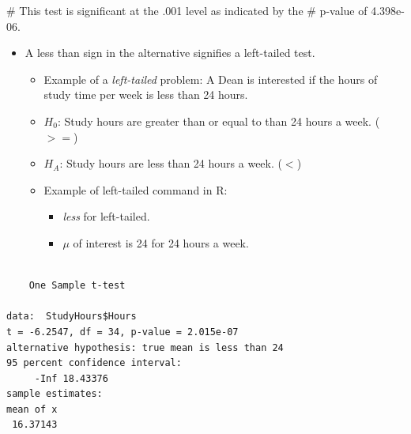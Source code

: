 \documentclass[
  letterpaper,
  DIV=11,
  numbers=noendperiod]{scrreprt}
\newenvironment{Shaded}{\begin{snugshade}}{\end{snugshade}}
\newcommand{\AttributeTok}[1]{\textcolor[rgb]{0.40,0.45,0.13}{#1}}
\newcommand{\CommentTok}[1]{\textcolor[rgb]{0.37,0.37,0.37}{#1}}
\newcommand{\DecValTok}[1]{\textcolor[rgb]{0.68,0.00,0.00}{#1}}
\newcommand{\FunctionTok}[1]{\textcolor[rgb]{0.28,0.35,0.67}{#1}}
\newcommand{\NormalTok}[1]{\textcolor[rgb]{0.00,0.23,0.31}{#1}}
\newcommand{\SpecialCharTok}[1]{\textcolor[rgb]{0.37,0.37,0.37}{#1}}
\newcommand{\StringTok}[1]{\textcolor[rgb]{0.13,0.47,0.30}{#1}}
\providecommand{\tightlist}{%
  \setlength{\itemsep}{0pt}\setlength{\parskip}{0pt}}\usepackage{longtable,booktabs,array}
\begin{document}
\begin{Shaded}
\begin{Highlighting}[]
\CommentTok{\# This test is significant at the .001 level as indicated by the}
\CommentTok{\# p{-}value of 4.398e{-}06.}
\end{Highlighting}
\end{Shaded}

\begin{itemize}
\tightlist
\item
  A less than sign in the alternative signifies a left-tailed test.

  \begin{itemize}
  \tightlist
  \item
    Example of a \emph{left-tailed} problem: A Dean is interested if the
    hours of study time per week is less than 24 hours.
  \item
    \(H_0\): Study hours are greater than or equal to than 24 hours a
    week. (\(>=\))
  \item
    \(H_A\): Study hours are less than 24 hours a week. (\(<\))
  \item
    Example of left-tailed command in R:

    \begin{itemize}
    \tightlist
    \item
      \emph{less} for left-tailed.
    \item
      \emph{\(\mu\)} of interest is 24 for 24 hours a week.
    \end{itemize}
  \end{itemize}
\end{itemize}

\begin{Shaded}
\end{Shaded}

\begin{verbatim}

    One Sample t-test

data:  StudyHours$Hours
t = -6.2547, df = 34, p-value = 2.015e-07
alternative hypothesis: true mean is less than 24
95 percent confidence interval:
     -Inf 18.43376
sample estimates:
mean of x 
 16.37143 
\end{verbatim}
\end{document}
